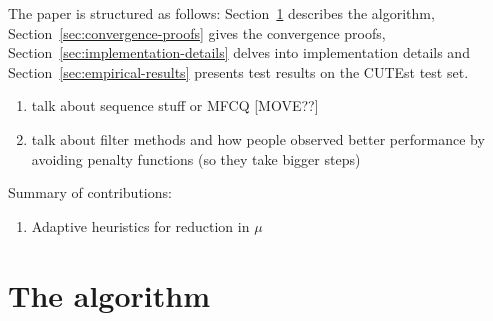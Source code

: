 \documentclass{article}
\begin{document}
The paper is structured as follows: Section~\ref{sec:basic-alg} describes the algorithm, Section~\ref{sec:convergence-proofs} gives the convergence proofs, Section~\ref{sec:implementation-details} delves into implementation details and Section~\ref{sec:empirical-results} presents test results on the CUTEst test set.


{\color{red}
\begin{enumerate}
\item talk about sequence stuff or MFCQ [MOVE??]
\item talk about filter methods and how people observed better performance by avoiding penalty functions (so they take bigger steps)
\end{enumerate}


Summary of contributions:

\begin{enumerate}
\item Adaptive heuristics for reduction in $\mu$
\end{enumerate}
}



\section{The algorithm}\label{sec:basic-alg}
\end{document}
